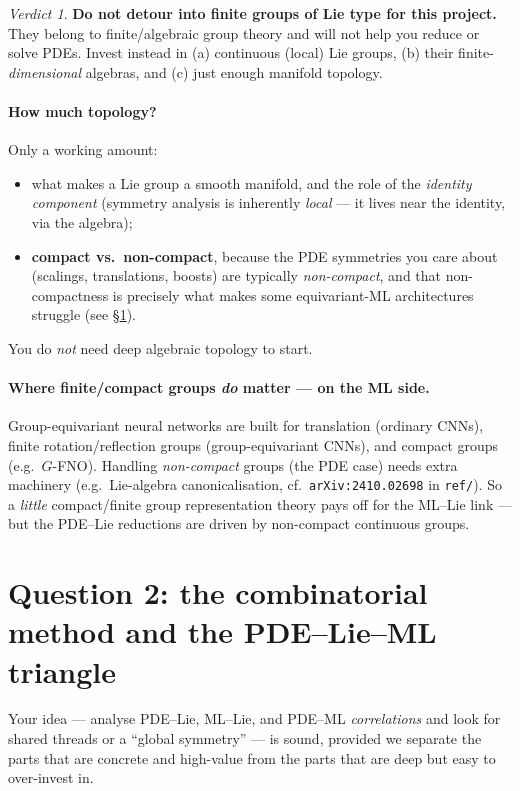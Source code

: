 \documentclass[11pt]{article}
\theoremstyle{definition}
\theoremstyle{remark}
\newtheorem*{verdict}{Verdict}
\begin{document}
\begin{verdict}
\textbf{Do not detour into finite groups of Lie type for this project.} They belong to finite/algebraic
group theory and will not help you reduce or solve PDEs. Invest instead in (a) continuous (local) Lie
groups, (b) their finite-\emph{dimensional} algebras, and (c) just enough manifold topology.
\end{verdict}

\paragraph{How much topology?} Only a working amount:
\begin{itemize}[nosep]
  \item what makes a Lie group a smooth manifold, and the role of the \emph{identity component} (symmetry
        analysis is inherently \emph{local} --- it lives near the identity, via the algebra);
  \item \textbf{compact vs.\ non-compact}, because the PDE symmetries you care about (scalings,
        translations, boosts) are typically \emph{non-compact}, and that non-compactness is precisely
        what makes some equivariant-ML architectures struggle (see \S\ref{sec:triangle}).
\end{itemize}
You do \emph{not} need deep algebraic topology to start.

\paragraph{Where finite/compact groups \emph{do} matter --- on the ML side.} Group-equivariant neural
networks are built for translation (ordinary CNNs), finite rotation/reflection groups
(group-equivariant CNNs), and compact groups (e.g.\ $G$-FNO). Handling \emph{non-compact} groups (the PDE
case) needs extra machinery (e.g.\ Lie-algebra canonicalisation, cf.\ \texttt{arXiv:2410.02698} in
\texttt{ref/}). So a \emph{little} compact/finite group representation theory pays off for the ML--Lie
link --- but the PDE--Lie reductions are driven by non-compact continuous groups.

\section{Question 2: the combinatorial method and the PDE--Lie--ML triangle}
\label{sec:triangle}

Your idea --- analyse PDE--Lie, ML--Lie, and PDE--ML \emph{correlations} and look for shared threads or a
``global symmetry'' --- is sound, provided we separate the parts that are concrete and high-value from the
parts that are deep but easy to over-invest in.
\end{document}

